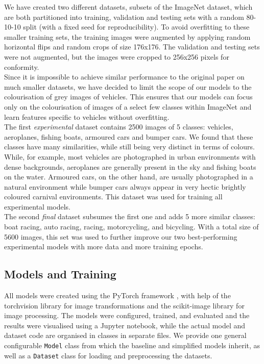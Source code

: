 \documentclass{article}
\begin{document}
We have created two different datasets, subsets of the ImageNet dataset, which are both partitioned
into training, validation and testing sets with a random 80-10-10 split (with a fixed seed for reproducibility).
To avoid overfitting to these smaller training sets, the training images were augmented
by applying random horizontal flips and random crops of size 176x176.
The validation and testing sets were not augmented, but the images were cropped to 256x256 pixels for conformity.\\
Since it is impossible to achieve similar performance to the original paper on much smaller datasets,
we have decided to limit the scope of our models to the colourisation of grey images of vehicles.
This ensures that our models can focus only on the colourisation of images of a select
few classes within ImageNet and learn features specific to vehicles without overfitting.\\
The first \textit{experimental} dataset contains 2500 images of 5 classes: vehicles, aeroplanes, fishing boats, armoured cars and bumper cars.
We found that these classes have many similarities, while still being very distinct
in terms of colours. While, for example, most vehicles are photographed in urban environments with dense backgrounds,
aeroplanes are generally present in the sky and fishing boats on the water. Armoured cars, on the other hand, are usually
photographed in a natural environment while bumper cars always appear in very hectic brightly coloured carnival environments.
This dataset was used for training all experimental models.\\
The second \textit{final} dataset subsumes the first one and adds 5 more similar classes: boat racing, auto racing, racing, motorcycling,
and bicycling. With a total size of 5600 images, this set was used to further improve our two best-performing experimental models with
more data and more training epochs.

\subsection{Models and Training}
All models were created using the PyTorch framework \cite{pytorch}, with help of the
torchvision library for image transformations and the scikit-image library for
image processing.
The models were configured, trained, and evaluated and the results were visualised using a Jupyter
notebook, while the actual model and dataset code are organised in classes in separate files.
We provide one general configurable \texttt{Model} class from which the baseline and simplified
models inherit, as well as a \texttt{Dataset} class for loading and preprocessing the datasets.
\end{document}

